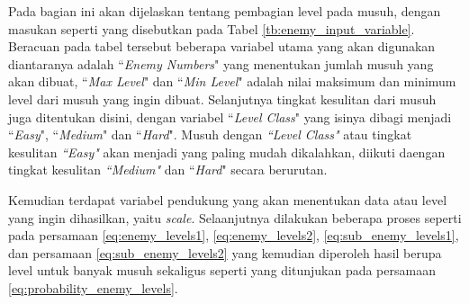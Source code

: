 Pada bagian ini akan dijelaskan tentang pembagian level pada musuh, dengan masukan seperti yang disebutkan pada Tabel \ref{tb:enemy_input_variable}. Beracuan pada tabel tersebut beberapa variabel utama yang akan digunakan diantaranya adalah ``\textit{Enemy Numbers}" yang menentukan jumlah musuh yang akan dibuat, ``\textit{Max Level}" dan ``\textit{Min Level}" adalah nilai maksimum dan minimum level dari musuh yang ingin dibuat. Selanjutnya tingkat kesulitan dari musuh juga ditentukan disini, dengan variabel ``\textit{Level Class}" yang isinya dibagi menjadi ``\textit{Easy}", ``\textit{Medium}" dan ``\textit{Hard}". Musuh dengan \textit{``Level Class"} atau tingkat kesulitan \textit{``Easy"} akan menjadi yang paling mudah dikalahkan, diikuti daengan tingkat kesulitan \textit{``Medium"} dan ``\textit{Hard}" secara berurutan.
\vspace{1ex}

Kemudian terdapat variabel pendukung yang akan menentukan data atau level yang ingin dihasilkan, yaitu \textit{scale}. Selaanjutnya dilakukan beberapa proses seperti pada persamaan \ref{eq:enemy_levels1}, \ref{eq:enemy_levels2}, \ref{eq:sub_enemy_levels1}, dan persamaan \ref{eq:sub_enemy_levels2} yang kemudian diperoleh hasil berupa level untuk banyak musuh sekaligus seperti yang ditunjukan pada persamaan \ref{eq:probability_enemy_levels}.
\vspace{1ex}

